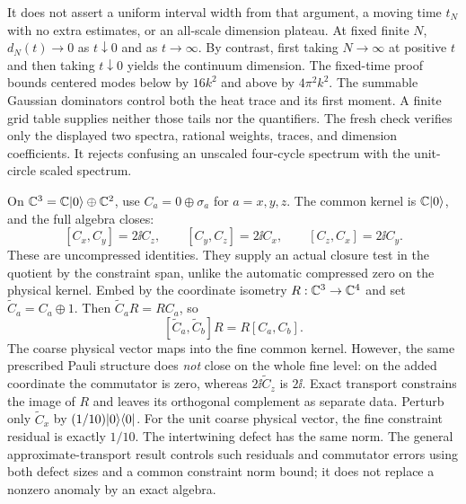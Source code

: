 It does not assert a uniform interval width from that argument, a moving time $t_N$ with no extra estimates, or an all-scale dimension plateau. At fixed finite $N$, $d_N(t)\to0$ as $t\downarrow0$ and as $t\to\infty$. By contrast, first taking $N\to\infty$ at positive $t$ and then taking $t\downarrow0$ yields the continuum dimension.
The fixed-time proof bounds centered modes below by $16k^2$ and above by $4\pi^2k^2$. The summable Gaussian dominators control both the heat trace and its first moment. A finite grid table supplies neither those tails nor the quantifiers. The fresh check verifies only the displayed two spectra, rational weights, traces, and dimension coefficients. It rejects confusing an unscaled four-cycle spectrum with the unit-circle scaled spectrum.

On $\CC^3=\CC\ket0\oplus\CC^2$, use $C_a=0\oplus\sigma_a$ for $a=x,y,z$. The common kernel is $\CC\ket0$, and the full algebra closes:
\[
[C_x,C_y]=2\ii C_z,\qquad[C_y,C_z]=2\ii C_x,\qquad[C_z,C_x]=2\ii C_y.
\]
These are uncompressed identities. They supply an actual closure test in the quotient by the constraint span, unlike the automatic compressed zero on the physical kernel.
Embed by the coordinate isometry $R:\CC^3\to\CC^4$ and set $\widetilde C_a=C_a\oplus1$. Then $\widetilde C_aR=RC_a$, so
\[
[\widetilde C_a,\widetilde C_b]R=R[C_a,C_b].
\]
The coarse physical vector maps into the fine common kernel. However, the same prescribed Pauli structure does \emph{not} close on the whole fine level: on the added coordinate the commutator is zero, whereas $2\ii\widetilde C_z$ is $2\ii$. Exact transport constrains the image of $R$ and leaves its orthogonal complement as separate data.
Perturb only $\widetilde C_x$ by $(1/10)\lvert 0\rangle\langle 0\rvert$. For the unit coarse physical vector, the fine constraint residual is exactly $1/10$. The intertwining defect has the same norm. The general approximate-transport result controls such residuals and commutator errors using both defect sizes and a common constraint norm bound; it does not replace a nonzero anomaly by an exact algebra.

